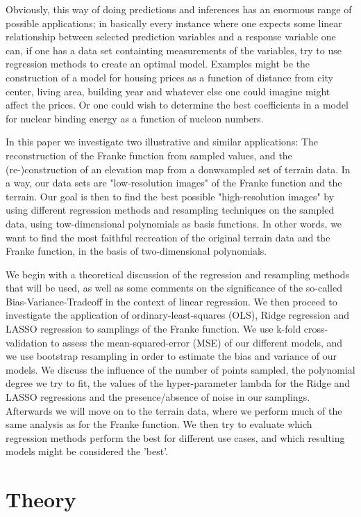 \documentclass[reprint, english, nofootinbib]{revtex4-2}
\begin{document}
     Obviously, this way of doing predictions and inferences has an enormous range of possible applications; in basically every instance where one expects some linear relationship between selected prediction variables and a response variable one can, if one has a data set containting measurements of the variables, try to use regression methods to create an optimal model. Examples might be the construction of a model for housing prices as a function of distance from city center, living area, building year and whatever else one could imagine might affect the prices. Or one could wish to determine the best coefficients in a model for nuclear binding energy as a function of nucleon numbers.
     
     In this paper we investigate two illustrative and similar applications: The reconstruction of the Franke function from sampled values, and the (re-)construction of an elevation map from a donwsampled set of terrain data. In a way, our data sets are "low-resolution images" of the Franke function and the terrain. Our goal is then to find the best possible "high-resolution images" by using different regression methods and resampling techniques on the sampled data, using tow-dimensional polynomials as basis functions. In other words, we want to find the most faithful recreation of the original terrain data and the Franke function, in the basis of two-dimensional polynomials.

     We begin with a theoretical discussion of the regression and resampling methods that will be used, as well as some comments on the significance of the so-called Bias-Variance-Tradeoff in the context of linear regression. We then proceed to investigate the application of ordinary-least-squares (OLS), Ridge regression and LASSO regression to samplings of the Franke function. We use k-fold cross-validation to assess the mean-squared-error (MSE) of our different models, and we use bootstrap resampling in order to estimate the bias and variance of our models. We discuss the influence of the number of points sampled, the polynomial degree we try to fit, the values of the hyper-parameter lambda for the Ridge and LASSO regressions and the presence/absence of noise in our samplings. Afterwards we will move on to the terrain data, where we perform much of the same analysis as for the Franke function. We then try to evaluate which regression methods perform the best for different use cases, and which resulting models might be considered the 'best'.


\section{Theory}
\end{document}
